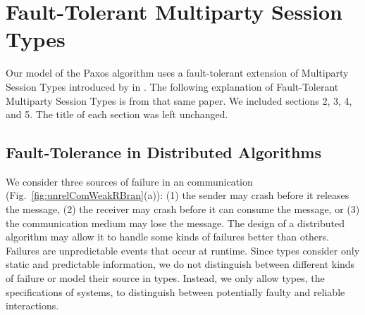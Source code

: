 \section{Fault-Tolerant Multiparty Session Types}
Our model of the Paxos algorithm uses a fault-tolerant extension of Multiparty Session Types introduced by \citeauthor{PetersEtal21} in \cite{PetersEtal21}.
The following explanation of Fault-Tolerant Multiparty Session Types is from that same paper.
We included sections 2, 3, 4, and 5.
The title of each section was left unchanged.

\subsection{Fault-Tolerance in Distributed Algorithms}
\label{sec:faultTol}
We consider three sources of failure in an \unrel communication (Fig.~\ref{fig:unrelComWeakRBran}(a)):
(1) the sender may crash before it releases the message,
(2) the receiver may crash before it can consume the message, or
(3) the communication medium may lose the message.
The design of a distributed algorithm may allow it to handle some kinds of failures better than others.
Failures are unpredictable events that occur at runtime.
Since types consider only static and predictable information, we do not distinguish between different kinds of failure or model their source in types.
Instead, we only allow types, \ie the specifications of systems, to distinguish between potentially faulty and reliable interactions.

